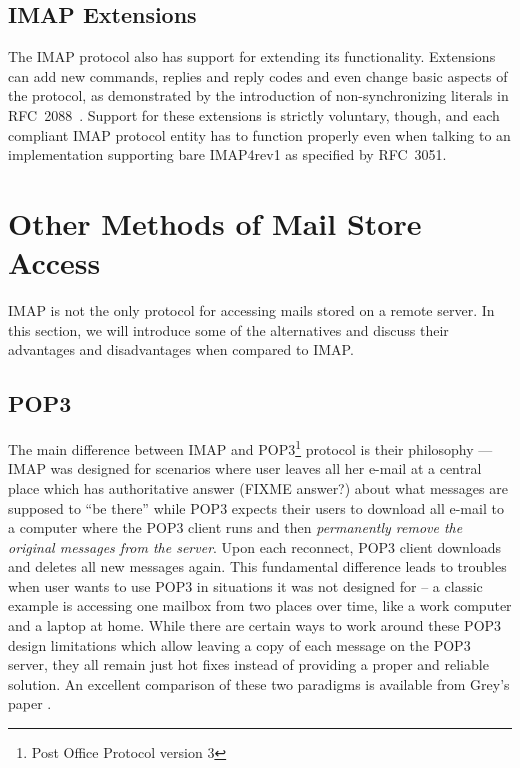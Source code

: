 \documentclass[12pt,notitlepage]{report}
\begin{document}
\subsection{IMAP Extensions}

The IMAP protocol also has support for extending its functionality.  Extensions
can add new commands, replies and reply codes and even change basic aspects of
the protocol, as demonstrated by the introduction of non-synchronizing literals
in RFC~2088~\cite{rfc-literalplus}. Support for these extensions is strictly
voluntary, though, and each compliant IMAP protocol entity has to function
properly even when talking to an implementation supporting bare IMAP4rev1 as
specified by RFC~3051.

\section{Other Methods of Mail Store Access}

IMAP is not the only protocol for accessing mails stored on a remote server.  In
this section, we will introduce some of the alternatives and discuss their
advantages and disadvantages when compared to IMAP.

\subsection{POP3}

The main difference between IMAP and POP3\footnote{Post Office Protocol version
3} protocol is their philosophy --- IMAP was designed for scenarios where user
leaves all her e-mail at a central place which has authoritative answer (FIXME answer?) about
what messages are supposed to ``be there'' while POP3 expects their users to
download all e-mail to a computer where the POP3 client runs and then {\em
permanently remove the original messages from the server}.  Upon each reconnect,
POP3 client downloads and deletes all new messages again.  This fundamental
difference leads to troubles when user wants to use POP3 in situations it was not
designed for -- a classic example is accessing one mailbox from two places over
time, like a work computer and a laptop at home.  While there are certain ways
to work around these POP3 design limitations which allow leaving a copy of each
message on the POP3 server, they all remain just hot fixes
instead of providing a proper and reliable solution.  An excellent comparison of
these two paradigms is available from Grey's paper \cite{imap-vs-pop}.
\end{document}
